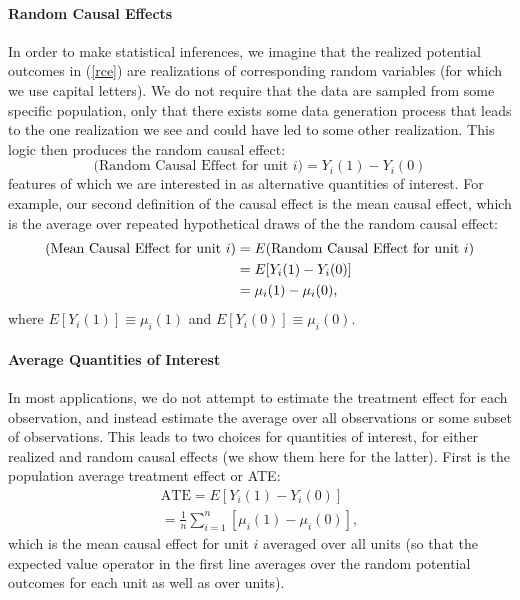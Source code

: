 \documentclass[11pt,titlepage]{article}
\begin{document}
\paragraph{Random Causal Effects} In order to make statistical
inferences, we imagine that the realized potential outcomes in
(\ref{rce}) are realizations of corresponding random variables (for
which we use capital letters).  We do not require that the data are
sampled from some specific population, only that there exists some
data generation process that leads to the one realization we see and
could have led to some other realization.  This logic then produces the
random causal effect:
\begin{equation}
  \label{rance}
  \text{(Random Causal Effect for unit $i$)}  = Y_i(1) - Y_i(0)
\end{equation}
features of which we are interested in as alternative quantities of
interest.  For example, our second definition of the causal effect is
the mean causal effect, which is the average over repeated
hypothetical draws of the the random causal effect:
\begin{align}
  \label{meance}
  \text{(Mean Causal Effect for unit $i$)}
  &= E(\text{Random Causal Effect for unit $i$})\\ 
  &= E[Y_i(1) - Y_i(0)]\\ \notag
  &= \mu_i(1) - \mu_i(0),
\end{align}
where $E[Y_i(1)]\equiv\mu_i(1)$ and $E[Y_i(0)]\equiv\mu_i(0)$.

\paragraph{Average Quantities of Interest}
In most applications, we do not attempt to estimate the treatment
effect for each observation, and instead estimate the average over all
observations or some subset of observations.  This leads to two
choices for quantities of interest, for either realized and random
causal effects (we show them here for the latter).  First is the
population average treatment effect or ATE:
\begin{align}
  \label{pate}
  \text{ATE} = E[Y_i(1) - Y_i(0)] \\
             = \frac{1}{n}\sum_{i=1}^n[\mu_i(1) - \mu_i(0)],
\end{align}
which is the mean causal effect for unit $i$ averaged over all units
(so that the expected value operator in the first line averages over
the random potential outcomes for each unit as well as over units).
\end{document}
